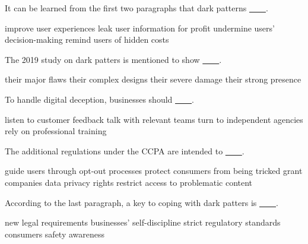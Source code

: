 \item It can be learned from the first two paragraphs that dark patterns \uline{~~~~}.
\begin{tasks}
	\task improve user experiences
	\task leak user information for profit
	\task undermine users' decision-making
	\task remind users of hidden costs
\end{tasks}
\item The 2019 study on dark patters is mentioned to show \uline{~~~~}.
\begin{tasks}
	\task their major flaws
	\task their complex designs
	\task their severe damage
	\task their strong presence
\end{tasks}
\item To handle digital deception, businesses should \uline{~~~~}.
\begin{tasks}
	\task listen to customer feedback
	\task talk with relevant teams
	\task turn to independent agencies
	\task rely on professional training
\end{tasks}
\item The additional regulations under the CCPA are intended to \uline{~~~~}.
\begin{tasks}
	\task guide users through opt-out processes
	\task protect consumers from being tricked
	\task grant companies data privacy rights
	\task restrict access to problematic content
\end{tasks}
\item According to the last paragraph, a key to coping with dark patters is \uline{~~~~}.
\begin{tasks}
	\task new legal requirements
	\task businesses' self-discipline
	\task strict regulatory standards
	\task consumers safety awareness
\end{tasks}
